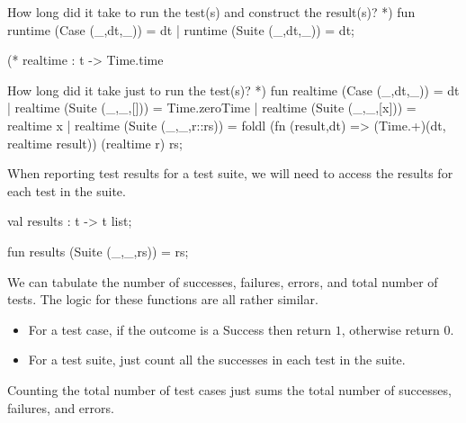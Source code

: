 How long did it take to run the test(s) and construct the
result(s)? *)
  fun runtime (Case (_,dt,_)) = dt
    | runtime (Suite (_,dt,_)) = dt;

  (* realtime : t -> Time.time

How long did it take just to run the test(s)? *)
  fun realtime (Case (_,dt,_)) = dt
    | realtime (Suite (_,_,[])) = Time.zeroTime
    | realtime (Suite (_,_,[x])) = realtime x
    | realtime (Suite (_,_,r::rs)) =
      foldl (fn (result,dt) =>
                (Time.+)(dt, realtime result))
            (realtime r)
            rs;
\eatline
{}\nwendcode{}\nwdocspar
\begin{node}
When reporting test results for a test suite, we will need to access
the results for each test in the suite.
\end{node}

\nwenddocs{}\plusendmoddef\nwstartdeflinemarkup{}\nwenddeflinemarkup
val results : t -> t list;
\nwendcode{}\nwdocspar

\nwenddocs{}\plusendmoddef\nwstartdeflinemarkup{}\nwenddeflinemarkup
fun results (Suite (_,_,rs)) = rs;
\eatline
{}\nwendcode{}\nwdocspar
\begin{node}
We can tabulate the number of successes, failures, errors, and total
number of tests. The logic for these functions are all rather similar.
\begin{itemize}
\item For a test case, if the outcome is a {\Tt{}Success\nwendquote} then return
  $1$, otherwise return $0$.
\item For a test suite, just count all the successes in each test in
  the suite.
\end{itemize}
Counting the total number of test cases just sums the total number of
successes, failures, and errors.
\end{node}

